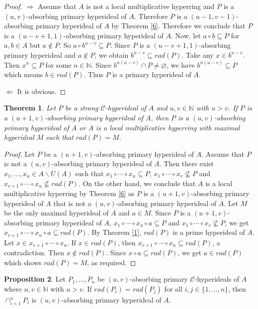 \documentclass[preprint,review,10pt]{amsart}
\newtheorem{theorem}{Theorem}[section]
\theoremstyle{definition}
\newtheorem{proposition}[theorem]{Proposition}
\theoremstyle{remark}
\numberwithin{equation}{section}
\begin{document}
\begin{proof}
$\Longrightarrow$ Assume that $A$ is not a local multiplicative hyperring and $P$ is a $(u,v)$-absorbing primary hyperideal of $A$. Therefore  $P$ is a $(u-1,v-1)$-absorbing primary hyperideal of $A$  by Theorem \ref{6}. Therefore we conclude that  $P$ is a $(u-v+1,1)$-absorbing primary hyperideal of $A$. Now, let $a \circ b \subseteq P$ for $a,b \in A$ but $a \notin P$. So $a \circ b^{u-v} \subseteq P$. Since $P$ is a $(u-v+1,1)$-absorbing primary hyperideal and $a \notin P$, we obtain $b^{u-v} \subseteq rad(P)$. Take any $x \in b^{u-v}$. Then $x^n \subseteq P$ for some $n \in \mathbb{N}$. Since $b^{n(u-v)} \cap P \neq \varnothing$, we have $b^{n(u-v)} \subseteq  P$ which means $b \in rad(P)$. Thus $P$ is a primary hyperideal of $A$.

$\Longleftarrow$ It is obvious.
\end{proof}
\begin{theorem}
Let $P$ be a strong $\mathcal{C}$-hyperideal of $A$  and $u,v \in \mathbb{N}$ with $u >v$. If $P$ is a $(u+1,v)$-absorbing primary hyperideal of $A$, then $P$ is a $(u,v)$-absorbing primary hyperideal of $A$ or $A$ is a local multiplicative hyperring with maximal hyperideal $M$ such that $rad(P)=M$.
\end{theorem}
\begin{proof}
Let  $P$ be a $(u+1,v)$-absorbing primary hyperideal of $A$. Assume that $P$ is not a $(u,v)$-absorbing primary hyperideal of $A$. Then there exist $x_1,\ldots,x_u \in A \backslash U(A)$ such that $x_1 \circ \cdots \circ x_u \subseteq P$, $x_1\circ \cdots \circ x_v \nsubseteq P$ and $x_{v+1}\circ \cdots \circ x_u \nsubseteq rad(P)$. On the other hand,   we conclude that $A$ is a local multiplicative hyperring by Theorem \ref{6} as $P$ is a $(u+1,v)$-absorbing primary hyperideal of $A$  that   is not a $(u,v)$-absorbing primary hyperideal of $A$. Let $M$ be the only maximal hyperideal of $A$ and $a \in M$. Since $P$ is a $(u+1,v)$-absorbing primary hyperideal of $A$, $x_1\circ \cdots \circ x_u \circ a \subseteq P$ and $x_1\circ \cdots \circ x_v \nsubseteq P$, we get $x_{v+1}\circ \cdots \circ x_u \circ a \subseteq rad(P)$. By Theorem \ref{1}, $rad(P)$ is a prime hyperideal of $A$. Let  $x \in x_{v+1}\circ \cdots \circ x_u $. If $x \in rad(P)$, then $x_{v+1}\circ \cdots \circ x_u  \subseteq rad(P)$, a contradiction. Then $x \notin rad(P)$. Since $x \circ a \subseteq rad(P)$, we get $a \in rad(P)$ which shows $rad(P)=M$, as required. 
\end{proof}
\begin{proposition} \label{ignor}
Let $P_1, \ldots,P_n$ be $(u,v)$-absorbing primary $\mathcal{C}$-hyperideals of $A$ where $u,v \in \mathbb{N}$ with $u >v$. If $rad(P_i)=rad(P_j)$ for all $i,j \in \{1,\ldots,n\}$, then $\cap_{i=1}^nP_i$ is $(u,v)$-absorbing primary hyperideal of $A$.
\end{proposition}
\end{document}
